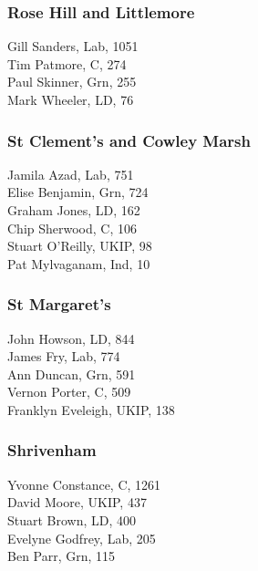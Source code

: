 \documentclass[a4paper,openany,10pt]{book}
\begin{document}
\subsubsection*{Rose Hill and Littlemore}



Gill Sanders, Lab, 1051\\
Tim Patmore, C, 274\\
Paul Skinner, Grn, 255\\
Mark Wheeler, LD, 76\\


\subsubsection*{{St Clement's and Cowley Marsh}}



Jamila Azad, Lab, 751\\
Elise Benjamin, Grn, 724\\
Graham Jones, LD, 162\\
Chip Sherwood, C, 106\\
Stuart O'Reilly, UKIP, 98\\
Pat Mylvaganam, Ind, 10\\


\subsubsection*{St Margaret's}



John Howson, LD, 844\\
James Fry, Lab, 774\\
Ann Duncan, Grn, 591\\
Vernon Porter, C, 509\\
Franklyn Eveleigh, UKIP, 138\\


\subsubsection*{Shrivenham}



Yvonne Constance, C, 1261\\
David Moore, UKIP, 437\\
Stuart Brown, LD, 400\\
Evelyne Godfrey, Lab, 205\\
Ben Parr, Grn, 115\\
\end{document}
